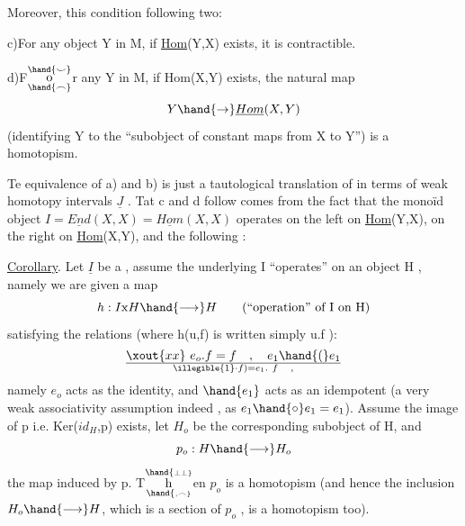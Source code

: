 Moreover,  this condition  following two:

c)\quad For any object Y in M, if \underline{Hom}(Y,X) exists, it is contractible.

d)\quad F$\overset{\hand{\smile}}{\underset{\hand{\frown}}{\mathrm o}}$r any Y in M, if Hom(X,Y) exists, the natural map
\[ Y \hand{\to} \underline{Hom}(X,Y) \]
(identifying Y to the ``subobject of constant maps from X to Y'') is a
homotopism.

Te equivalence of a) and b) is just a tautological translation
of   in terms of  weak homotopy intervals $\underline{J}$ .
Tat c\hand{)} and d\hand{)} follow comes from the fact that the monoïd object
$I = \underline{End}(X,X) = \underline{Hom}(X,X)$ operates on the left on \underline{Hom}(Y,X), on the right
on \underline{Hom}(X,Y), and the following :

\uline{Corollary}. Let $\underline{I}$ be a , assume the underlying I
``operates'' on an object H , namely we are given a map
\[ h: I\mathrm{x}H \hand{\longrightarrow} H \qquad (\text{``operation'' of I on H}) \]
satisfying the relations (where h(u,f) is written simply u.f ):
\[ \xout{xx}\ e_o.f = f \quad , \quad e_1\hand{(}e_1\over{\illegible{1}}{\cdot}f) = e_1.\ f \quad , \]
namely $e_o$ acts as the identity, and $\hand{e_1}$ acts as an idempotent  (a very
weak associativity assumption indeed , as $e_1\hand{\circ}e_1 = e_1$). Assume the image
of p i.e. Ker($id_H$,p) exists, let $H_o$ be the corresponding subobject of
H, and 
\[ p_o : H \hand{\longrightarrow} H_o \]
the map induced by p. T$\overset{\hand{\scriptscriptstyle\perp\perp}}{\underset{\hand{\scriptscriptstyle,\frown}}{\mathrm h}}$en $p_o$ is a homotopism (and hence the inclusion
$H_o \hand{\longrightarrow} H$, which is a section of $p_o$ , is a homotopism too).

